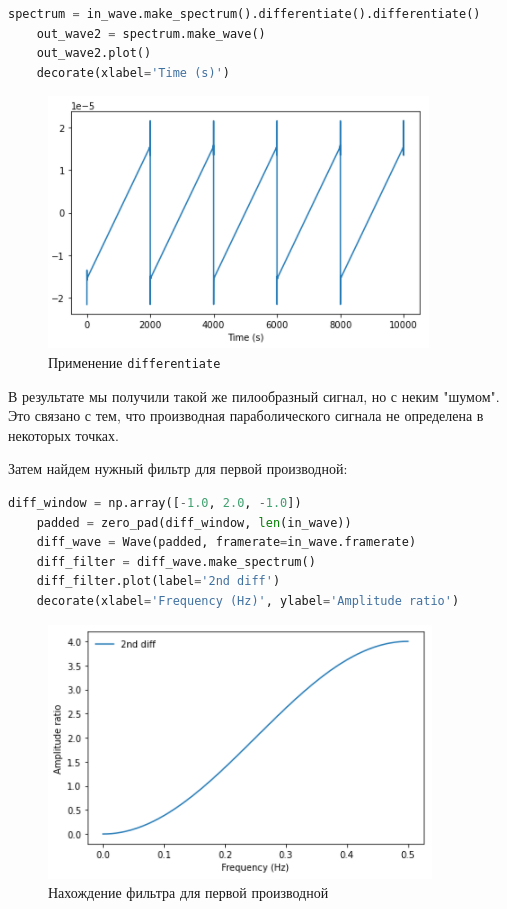 \documentclass[a4paper]{article}
\begin{document}
\begin{lstlisting}[language=Python, caption= Применение \texttt{differentiate}]
    spectrum = in_wave.make_spectrum().differentiate().differentiate()
    out_wave2 = spectrum.make_wave()
    out_wave2.plot()
    decorate(xlabel='Time (s)')
\end{lstlisting}
            
            \begin{figure}[H]
                \centering
                \includegraphics{ex_5_4.png}
                \caption{Применение \texttt{differentiate}}
                \label{fig:ex_5_4}
            \end{figure}
            
            В результате мы получили такой же пилообразный сигнал, но с неким "шумом". Это связано с тем, что производная параболического сигнала не определена в некоторых точках.
            
            Затем найдем нужный фильтр для первой производной:
            
\begin{lstlisting}[language=Python, caption= Нахождение фильтра для первой производной]
    diff_window = np.array([-1.0, 2.0, -1.0])
    padded = zero_pad(diff_window, len(in_wave))
    diff_wave = Wave(padded, framerate=in_wave.framerate)
    diff_filter = diff_wave.make_spectrum()
    diff_filter.plot(label='2nd diff')
    decorate(xlabel='Frequency (Hz)', ylabel='Amplitude ratio')
\end{lstlisting}
            
            \begin{figure}[H]
                \centering
                \includegraphics{ex_5_5.png}
                \caption{Нахождение фильтра для первой производной}
                \label{fig:ex_5_5}
            \end{figure}
            
\end{document}
